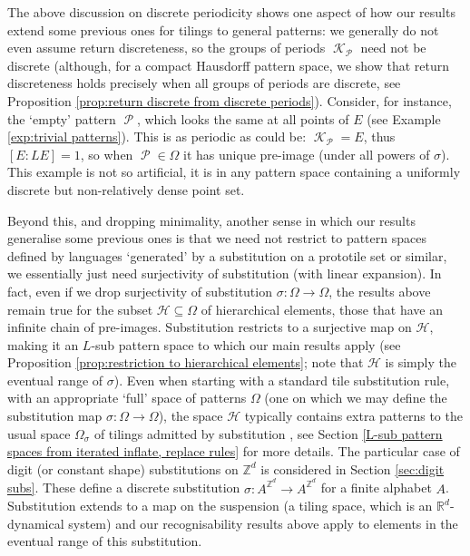 \documentclass[11pt]{amsart}
\numberwithin{equation}{section}
\theoremstyle{plain}
\theoremstyle{definition}
\newcommand{\R}{\mathbb R}
\newcommand{\Z}{\mathbb Z}
\newcommand{\sH}{\mathscr{H}}
\newcommand{\sub}{\sigma}
\DeclareMathOperator{\cP}{\mathcal{P}}
\DeclareMathOperator{\cK}{\mathcal{K}}
\begin{document}
The above discussion on discrete periodicity shows one aspect of how our results extend some previous ones for tilings to general patterns: we generally do not even assume return discreteness, so the groups of periods \(\cK_{\cP}\) need not be discrete (although, for a compact Hausdorff pattern space, we show that return discreteness holds precisely when all groups of periods are discrete, see Proposition \ref{prop:return discrete from discrete periods}). Consider, for instance, the `empty' pattern \(\cP\), which looks the same at all points of \(E\) (see Example \ref{exp:trivial patterns}). This is as periodic as could be: \(\cK_{\cP} = E\), thus \([E : LE] = 1\), so when \(\cP \in \Omega\) it has unique pre-image (under all powers of \(\sub\)). This example is not so artificial, it is in any pattern space containing a uniformly discrete but non-relatively dense point set.

Beyond this, and dropping minimality, another sense in which our results generalise some previous ones is that we need not restrict to pattern spaces defined by languages `generated' by a substitution on a prototile set or similar, we essentially just need surjectivity of substitution (with linear expansion). In fact, even if we drop surjectivity of substitution \(\sub \colon \Omega \to \Omega\), the results above remain true for the subset \(\sH \subseteq \Omega\) of hierarchical elements, those that have an infinite chain of pre-images. Substitution restricts to a surjective map on \(\sH\), making it an \(L\)-sub pattern space to which our main results apply (see Proposition \ref{prop:restriction to hierarchical elements}; note that \(\sH\) is simply the eventual range of \(\sub\)). Even when starting with a standard tile substitution rule, with an appropriate `full' space of patterns \(\Omega\) (one on which we may define the substitution map \(\sub \colon \Omega \to \Omega\)), the space \(\sH\) typically contains extra patterns to the usual space \(\Omega_\sub\) of tilings admitted by substitution \cite{AP98}, see Section \ref{L-sub pattern spaces from iterated inflate, replace rules} for more details. The particular case of digit (or constant shape) substitutions on \(\Z^d\) is considered in Section \ref{sec:digit subs}. These define a discrete substitution \(\sub \colon A^{\Z^d} \to A^{\Z^d}\) for a finite alphabet \(A\). Substitution extends to a map on the suspension (a tiling space, which is an \(\R^d\)-dynamical system) and our recognisability results above apply to elements in the eventual range of this substitution.
\end{document}
